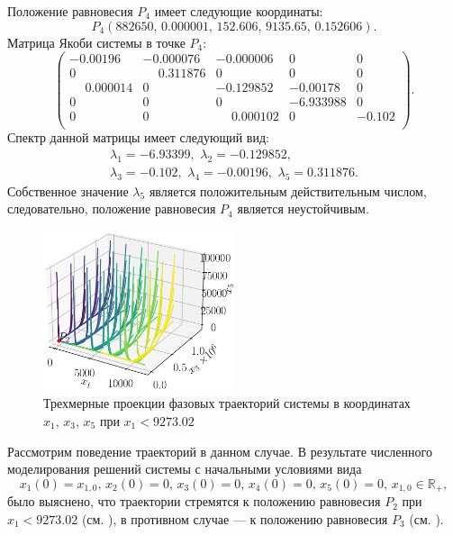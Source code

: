 \documentclass[14pt,a4paper]{extarticle}
\begin{document}
\begin{example}
		Положение равновесия $P_4$ имеет следующие координаты:
		\[P_4\left(882650,\,0.000001,\,152.606,\,9135.65,\,0.152606\right).\]
		Матрица Якоби системы в точке $P_4$: 
		\[\begin{pmatrix}
			-0.00196&  -0.000076 &-0.000006&  0    &    0\\
			 0     &   \phantom{-}0.311876&  0     &   0    &    0\\
			 \phantom{-}0.000014&  0     &  -0.129852& -0.00178 &  0\\
			 0   &     0     &   0    &   -6.933988 & 0\\
			 0    &    0   &     \phantom{-}0.000102 & 0    &   -0.102\\
		\end{pmatrix}.\]
		Спектр данной матрицы имеет следующий вид:
		\begin{multline*}
			\lambda_1=-6.93399,\,\, \lambda_2=-0.129852,\\
			\lambda_3=-0.102,\,\, \lambda_4=-0.00196,\,\, \lambda_5=0.311876.
		\end{multline*}
		Собственное значение $\lambda_5$ является положительным действительным числом, следовательно, положение равновесия $P_4$ является неустойчивым. 
		
		\begin{figure}[h]
			\centering
			\includegraphics[width=0.50\textwidth]{media/Figure_13.png}
			\caption{Трехмерные проекции фазовых траекторий системы в координатах $x_1,\, x_3,\, x_5$ при $x_1 < 9273.02$}
			\label{fig:model_P2_zone}
		\end{figure}
		
		Рассмотрим поведение траекторий в данном случае. В результате численного моделирования решений системы с начальными условиями вида 
		\[x_1(0)=x_{1,0},\, x_2(0)=0,\, x_3(0)=0,\, x_4(0)=0,\, x_5(0)=0,\, x_{1,0}\in\mathbb{R}_{+},\]
		было выяснено, что траектории стремятся к положению равновесия $P_2$ при $x_1 < 9273.02$ (см. ), в противном случае --- к положению равновесия $P_3$ (см. ).
		

\end{example}
\end{document}
